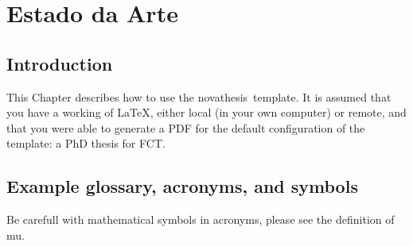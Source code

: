 
%

\chapter{Estado da Arte}
\label{cha:state_of_the_art}

\glsresetall

\section{Introduction}
\label{sec:introductionn}

This Chapter describes how to use the \gls{novathesis}\ template.  It is assumed that you have a working  of \LaTeX, either local (in your own computer) or remote, and that you were able to generate a PDF for the default configuration of the template: a PhD thesis for \gls{FCT}.

\section{Example glossary, acronyms, and symbols}
Be carefull with mathematical symbols in acronyms, please see the definition of \gls{mu}.
